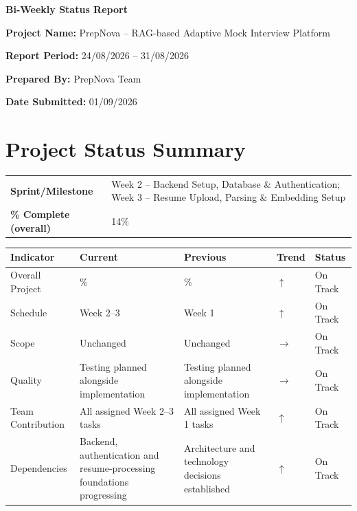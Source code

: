 \documentclass[11pt,a4paper]{article}
\newcommand{\field}[2]{\textbf{#1:} #2\par}
\begin{document}
\begin{center}
    {\LARGE\bfseries Bi-Weekly Status Report}\\[10pt]
\end{center}

\field{Project Name}{PrepNova -- RAG-based Adaptive Mock Interview Platform}
\field{Report Period}{24/08/2026 -- 31/08/2026}
\field{Prepared By}{PrepNova Team}
\field{Date Submitted}{01/09/2026}

\vspace{8pt}

\section{Project Status Summary}

\renewcommand{\arraystretch}{1.3}
\begin{tabular}{>{\bfseries}p{} p{}}
Sprint/Milestone & Week 2 -- Backend Setup, Database \& Authentication; Week 3 -- Resume Upload, Parsing \& Embedding Setup \\
\% Complete (overall) & 14\% \\
\end{tabular}

\begin{table}[htbp]
\centering
\label{tab:project-health-dashboard}
\renewcommand{\arraystretch}{1.4}
\begin{tabular}{>{\raggedright\arraybackslash}p{3.3cm}
                >{\centering\arraybackslash}p{2.4cm}
                >{\centering\arraybackslash}p{2.4cm}
                >{\centering\arraybackslash}p{1.7cm}
                >{\centering\arraybackslash}p{3.2cm}}
\toprule
\textbf{Indicator} &
\textbf{Current} &
\textbf{Previous} &
\textbf{Trend} &
\textbf{Status} \\
\midrule
Overall Project &
14\% &
7\% &
$\uparrow$ &
On Track\\

Schedule &
Week 2--3 &
Week 1 &
$\uparrow$ &
On Track\\

Scope &
Unchanged &
Unchanged &
$\rightarrow$ &
On Track\\

Quality &
Testing planned alongside implementation &
Testing planned alongside implementation &
$\rightarrow$ &
On Track\\

Team Contribution &
All assigned Week 2--3 tasks &
All assigned Week 1 tasks &
$\uparrow$ &
On Track\\

Dependencies &
Backend, authentication and resume-processing foundations progressing &
Architecture and technology decisions established &
$\uparrow$ &
On Track\\

\bottomrule
\end{tabular}
\end{table}
\end{document}
